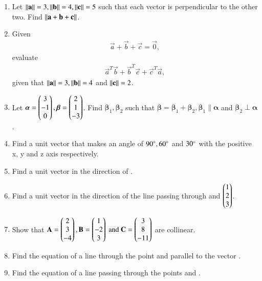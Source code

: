\begin{enumerate}[label=\arabic*.,ref=\thesubsection.\theenumi]
%
\item Let $\left\lVert\mathbf{a}\right\rVert = 3, \left\lVert\mathbf{b}\right\rVert= 4, \left\lVert\mathbf{c}\right\rVert = 5$ such that each vector is perpendicular to the other two.  Find $\left\lVert\mathbf{a}+\mathbf{b}+\mathbf{c}\right\rVert$.
%
\item Given 
\begin{align}
 \vec{a}+\vec{b}+\vec{c} = \vec{0}, 
\end{align}
evaluate 
\begin{align}
 \vec{a}^T\vec{b}+\vec{b}^T\vec{c}+\vec{c}^T\vec{a},
\end{align}
given that $\left\lVert \mathbf{a}\right\rVert=3, \left\lVert \mathbf{b}\right\rVert= 4$ and $\left\lVert \mathbf{c}\right\rVert = 2 $.
%
\item Let $\bm{\alpha} = \begin{pmatrix}3\\-1\\0\end{pmatrix}, \bm{\beta} = \begin{pmatrix}2\\1\\-3\end{pmatrix}$.  Find $\bm{\beta}_1, \bm{\beta}_2 $ such that $\bm{\beta}=\bm{\beta}_1+\bm{\beta}_2, \bm{\beta}_1 \parallel  \bm{\alpha} $ and $\bm{\beta}_2 \perp \bm{\alpha} $.
%
\item Find a unit vector that makes an angle of $90\degree, 60\degree$ and $30\degree$ with the positive x, y and z axis respectively.
%
\item Find a unit vector in the direction of .
%
\item Find a unit vector in the direction of the line passing through  and $\begin{pmatrix}1\\2\\3\end{pmatrix}$.
%
\item Show that 
$
\mathbf{A}=\begin{pmatrix}2\\3\\-4\end{pmatrix}, 
\mathbf{B}=\begin{pmatrix}1\\-2\\3\end{pmatrix} \text{ and } 
\mathbf{C}=\begin{pmatrix}3\\8\\-11\end{pmatrix}$  
are collinear.
%
\item Find the equation of a line through the point  and parallel to the vector .
\item Find the equation of a line passing through the points  and .

\end{enumerate}
